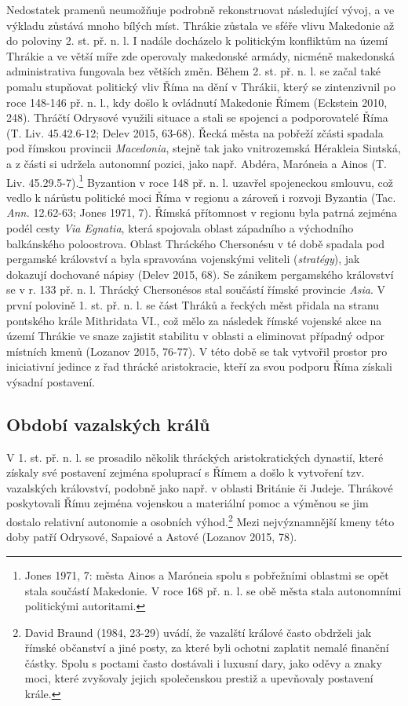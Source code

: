 Nedostatek pramenů neumožňuje podrobně rekonstruovat následující vývoj, a ve výkladu zůstává mnoho bílých míst. Thrákie zůstala ve sféře vlivu Makedonie až do poloviny 2. st. př. n. l. I nadále docházelo k politickým konfliktům na území Thrákie a ve větší míře zde operovaly makedonské armády, nicméně makedonská administrativa fungovala bez větších změn. Během 2. st. př. n. l. se začal také pomalu stupňovat politický vliv Říma na dění v Thrákii, který se zintenzivnil po roce 148-146 př. n. l., kdy došlo k ovládnutí Makedonie Římem (Eckstein 2010, 248). Thráčtí Odrysové využili situace a stali se spojenci a podporovatelé Říma (T. Liv. 45.42.6-12; Delev 2015, 63-68). Řecká města na pobřeží zčásti spadala pod římskou provincii {\em Macedonia}, stejně tak jako vnitrozemská Hérakleia Sintská, a z části si udržela autonomní pozici, jako např. Abdéra, Maróneia a Ainos (T. Liv. 45.29.5-7).\footnote{Jones 1971, 7: města Ainos a Maróneia spolu s pobřežními oblastmi se opět stala součástí Makedonie. V roce 168 př. n. l. se obě města stala autonomními politickými autoritami.} Byzantion v roce 148 př. n. l. uzavřel spojeneckou smlouvu, což vedlo k nárůstu politické moci Říma v regionu a zároveň i rozvoji Byzantia (Tac. {\em Ann.} 12.62-63; Jones 1971, 7). Římská přítomnost v regionu byla patrná zejména podél cesty {\em Via Egnatia}, která spojovala oblast západního a východního balkánského poloostrova. Oblast Thráckého Chersonésu v té době spadala pod pergamské království a byla spravována vojenskými veliteli ({\em stratégy}), jak dokazují dochované nápisy (Delev 2015, 68). Se zánikem pergamského království se v r. 133 př. n. l. Thrácký Chersonésos stal součástí římské provincie {\em Asia}. V první polovině 1. st. př. n. l. se část Thráků a řeckých měst přidala na stranu pontského krále Mithridata VI., což mělo za následek římské vojenské akce na území Thrákie ve snaze zajistit stabilitu v oblasti a eliminovat případný odpor místních kmenů (Lozanov 2015, 76-77). V této době se tak vytvořil prostor pro iniciativní jedince z řad thrácké aristokracie, kteří za svou podporu Říma získali výsadní postavení.

\subsection[období-vazalských-králů]{Období vazalských králů}

V 1. st. př. n. l. se prosadilo několik thráckých aristokratických dynastií, které získaly své postavení zejména spoluprací s Římem a došlo k vytvoření tzv. vazalských království, podobně jako např. v oblasti Británie či Judeje. Thrákové poskytovali Římu zejména vojenskou a materiální pomoc a výměnou se jim dostalo relativní autonomie a osobních výhod.\footnote{David Braund (1984, 23-29) uvádí, že vazalští králové často obdrželi jak římské občanství a jiné posty, za které byli ochotni zaplatit nemalé finanční částky. Spolu s poctami často dostávali i luxusní dary, jako oděvy a znaky moci, které zvyšovaly jejich společenskou prestiž a upevňovaly postavení krále.} Mezi nejvýznamnější kmeny této doby patří Odrysové, Sapaiové a Astové (Lozanov 2015, 78).

